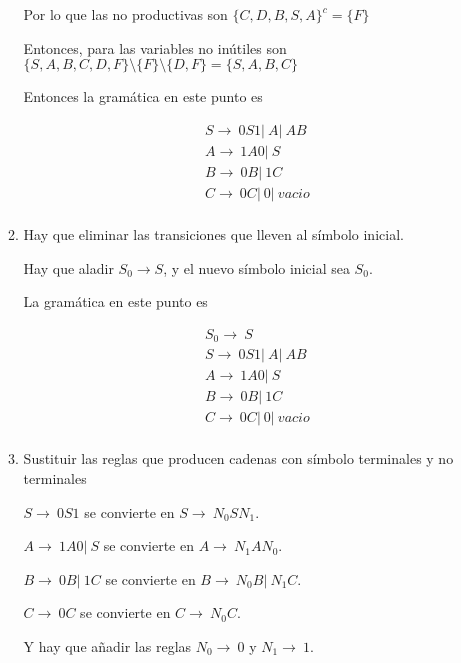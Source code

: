 \documentclass{article}
\begin{document}
\begin{enumerate}
\begin{enumerate}
        Por lo que las no productivas son $\{C, D, B, S, A\}^{c} = \{F\}$

        Entonces, para las variables no inútiles son
        $\{S, A, B, C, D, F\} \setminus \{F\} \setminus \{D, F\}
        = \{S, A, B, C\}$

        Entonces la gramática en este punto es 

        \begin{align*}
            &S \rightarrow \ 0S1 |\ A |\ AB \\
            &A \rightarrow \ 1A0 |\ S \\
            &B \rightarrow \ 0B |\ 1C \\
            &C \rightarrow \ 0C |\ 0 |\ vacio \\
        \end{align*}

        \item Hay que eliminar las transiciones que lleven al símbolo inicial.
        
        Hay que aladir $S_0 \rightarrow S$, y el nuevo símbolo inicial sea $S_0$.

        La gramática en este punto es

        \begin{align*}
            &S_0 \rightarrow \ S \\
            &S \rightarrow \ 0S1 |\ A |\ AB \\
            &A \rightarrow \ 1A0 |\ S \\
            &B \rightarrow \ 0B |\ 1C \\
            &C \rightarrow \ 0C |\ 0 |\ vacio \\
        \end{align*}

        \item Sustituir las reglas que producen cadenas con símbolo terminales y
        no terminales

        $S \rightarrow \ 0S1$ se convierte en $S \rightarrow \ N_0SN_1$.

        $A \rightarrow \ 1A0 |\ S$ se convierte en 
        $A \rightarrow \ N_1AN_0$.

        $B \rightarrow \ 0B |\ 1C$ se convierte en $B \rightarrow \ N_0B |\ N_1C$.

        $C \rightarrow \ 0C$ se convierte en $C \rightarrow \ N_0C$.
        
        Y hay que añadir las reglas $N_0 \rightarrow \ 0 $ y $N_1 \rightarrow \ 1$.


\end{enumerate}
\end{enumerate}
\end{document}
